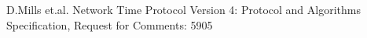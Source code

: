 	D.Mills et.al.
	Network Time Protocol Version 4: Protocol and Algorithms Specification, 
	Request for Comments: 5905